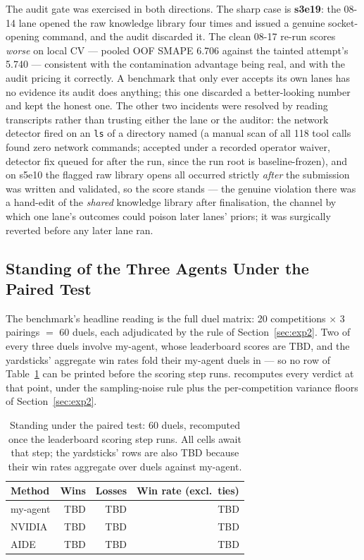 \documentclass[11pt,a4paper]{article}
\begin{document}
The audit gate was exercised in both directions. The sharp case is \textbf{s3e19}: the 08-14 lane opened the raw knowledge library four times and issued a genuine socket-opening command, and the audit discarded it. The clean 08-17 re-run scores \emph{worse} on local CV --- pooled OOF SMAPE 6.706 against the tainted attempt's 5.740 --- consistent with the contamination advantage being real, and with the audit pricing it correctly. A benchmark that only ever accepts its own lanes has no evidence its audit does anything; this one discarded a better-looking number and kept the honest one. The other two incidents were resolved by reading transcripts rather than trusting either the lane or the auditor: the network detector fired on an \texttt{ls} of a directory named  (a manual scan of all 118 tool calls found zero network commands; accepted under a recorded operator waiver, detector fix queued for after the run, since the run root is baseline-frozen), and on s5e10 the flagged raw library opens all occurred strictly \emph{after} the submission was written and validated, so the score stands --- the genuine violation there was a hand-edit of the \emph{shared} knowledge library after finalisation, the channel by which one lane's outcomes could poison later lanes' priors; it was surgically reverted before any later lane ran.

\subsection{Standing of the Three Agents Under the Paired Test}
\label{sec:winrates}

The benchmark's headline reading is the full duel matrix: 20 competitions $\times$ 3 pairings $=$ 60 duels, each adjudicated by the rule of Section~\ref{sec:exp2}. Two of every three duels involve my-agent, whose leaderboard scores are TBD, and the yardsticks' aggregate win rates fold their my-agent duels in --- so no row of Table~\ref{tab:winrates} can be printed before the scoring step runs.  recomputes every verdict at that point, under the sampling-noise rule plus the per-competition variance floors of Section~\ref{sec:exp2}.

\begin{table}[htbp]
\centering\small
\caption{Standing under the paired test: 60 duels, recomputed once the leaderboard scoring step runs. All cells await that step; the yardsticks' rows are also TBD because their win rates aggregate over duels against my-agent.}
\label{tab:winrates}
\begin{tabular}{@{}lrrr@{}}
\toprule
\textbf{Method} & \textbf{Wins} & \textbf{Losses} & \textbf{Win rate (excl.\ ties)} \\
\midrule
my-agent & TBD & TBD & TBD \\
NVIDIA   & TBD & TBD & TBD \\
AIDE     & TBD & TBD & TBD \\
\bottomrule
\end{tabular}
\end{table}
\end{document}
